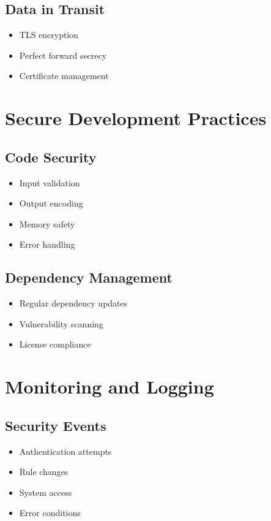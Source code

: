 \documentclass{article}
\begin{document}
\subsection{Data in Transit}
\begin{itemize}
    \item TLS encryption
    \item Perfect forward secrecy
    \item Certificate management
\end{itemize}

\section{Secure Development Practices}

\subsection{Code Security}
\begin{itemize}
    \item Input validation
    \item Output encoding
    \item Memory safety
    \item Error handling
\end{itemize}

\subsection{Dependency Management}
\begin{itemize}
    \item Regular dependency updates
    \item Vulnerability scanning
    \item License compliance
\end{itemize}

\section{Monitoring and Logging}

\subsection{Security Events}
\begin{itemize}
    \item Authentication attempts
    \item Rule changes
    \item System access
    \item Error conditions
\end{itemize}
\end{document}
